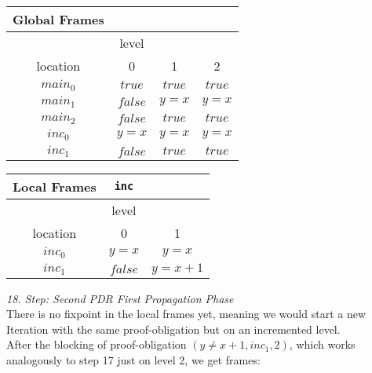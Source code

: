 \documentclass{article}
\begin{document}
\begin{minipage}{.4\textwidth}
	\setlength\tabcolsep{0.35em}
	\begin{center}
		\begin{tabu}{cccc}
			Global Frames \\
			\toprule
			& level \\
			\cmidrule(lr){2-4}
			location & 0 & 1 & 2 \\
			$main_0$ & $true$ & $true$ & $true$  \\
			$main_1$ & $false$ & $y = x$ & $y = x$\\
			$main_2$ & $false$ & $true$ & $true$ \\
			$inc_0$ & $y = x$ & $y = x$ & $y = x$ \\
			$inc_1$ & $false$ & $true$ & $true$\\
			\bottomrule
		\end{tabu}
	\end{center}
\end{minipage}
\hfill
\begin{minipage}{.5\textwidth}
	\setlength\tabcolsep{0.35em}
	\begin{center}
		\begin{tabu}{ccc}
			Local Frames & \texttt{inc}\\
			\toprule
			& level \\
			\cmidrule(lr){2-3}
			location & 0 & 1  \\
			$inc_0$ & $y = x$ & $y = x$  \\
			$inc_1$ & $false$ & $y = x + 1$ \\
			\bottomrule
		\end{tabu}
	\end{center}	
\end{minipage}

\vspace*{2em}
\textsl{18. Step: Second PDR First Propagation Phase} \\
There is no fixpoint in the local frames yet, meaning we would start a new Iteration with the same proof-obligation but on an incremented level.\\
After the blocking of proof-obligation $(y \neq x + 1, inc_1, 2)$, which works analogously to step 17 just on level 2, we get frames: \\ \\ 
\end{document}
